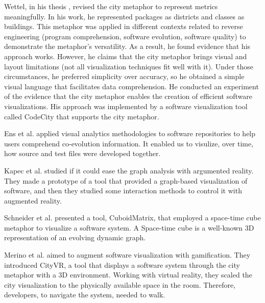 Wettel, in his thesis \cite{Wettel2011}, revised the city metaphor to represent metrics meaningfully. 
In his work, he represented packages as districts and classes as buildings.
This metaphor was applied in different contexts related to reverse engineering (program comprehension, software evolution, software quality)
to demonstrate the metaphor's versatility. As a result, he found evidence that his approach works.
However, he claims that the city metaphor brings visual and layout limitations 
(not all visualization techniques fit well with it). Under those circumstances, he preferred simplicity over accuracy,
so he obtained a simple visual language that facilitates data comprehension. He conducted an experiment of the evidence that the city
metaphor enables the creation of efficient software visualizations. His approach was implemented by a software visualization tool 
called CodeCity that supports the city metaphor. 





Ens et al. \cite{Ens2014} applied visual analytics methodologies to software repositories to help
users comprehend co-evolution information. It enabled us to visulize, over time, how source and test files were developed together. 

Kapec et al. \cite{Kapec2015} studied if it could ease the graph analysis with argumented reality. 
They made a prototype of a tool that provided a graph-based visualization of software, and then they studied some interaction methods to control it with augmented reality.

Schneider et al. \cite{Schneider2016} presented a tool, CuboidMatrix, that employed a space-time cube metaphor to visualize a software system. 
A Space-time cube is a well-known 3D representation of an evolving dynamic graph. 


Merino et al. \cite{Merino2017} aimed to augment software visualization with gamification. 
They introduced CityVR, a tool that displays a software system through the city metaphor with a 3D environment. 
Working with virtual reality, they scaled the city visualization to the physically available space in the room. 
Therefore, developers, to navigate the system, needed to walk. 

